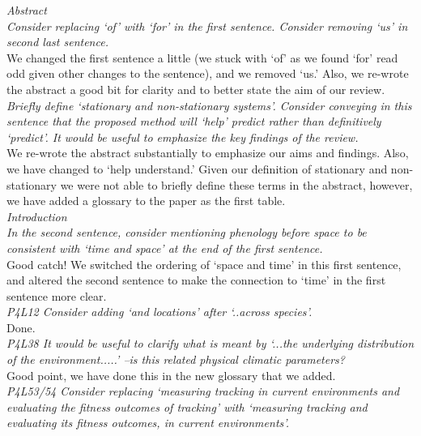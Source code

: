\documentclass[11pt]{article}
\begin{document}
\emph{ Abstract\\
Consider replacing `of' with `for' in the first sentence. Consider removing `us' in second
last sentence.}\\

We changed the first sentence a little (we stuck with `of' as we found `for' read odd given other changes to the sentence), and we removed `us.' Also, we re-wrote the abstract a good bit for clarity and to better state the aim of our review. \\

\emph{Briefly define `stationary and non-stationary systems'. Consider conveying in this sentence
that the proposed method will `help' predict rather than definitively `predict'. It would be
useful to emphasize the key findings of the review.}\\

We re-wrote the abstract substantially to emphasize our aims and findings. Also, we have changed to `help understand.' Given our definition of stationary and non-stationary we were not able to briefly define these terms in the abstract, however, we have added a glossary to the paper as the first table. \\

\emph{Introduction\\
In the second sentence, consider mentioning phenology before space to be consistent with
`time and space' at the end of the first sentence.}\\

Good catch! We switched the ordering of `space and time' in this first sentence, and altered the second sentence to make the connection to `time' in the first sentence more clear.\\

\emph{P4L12 Consider adding `and locations' after `..across species'.}\\

Done.\\

\emph{P4L38 It would be useful to clarify what is meant by `...the underlying distribution of the
environment.....' –is this related physical climatic parameters? }\\

Good point, we have done this in the new glossary that we added.\\

\emph{P4L53/54 Consider replacing `measuring tracking in current environments and evaluating the
fitness outcomes of tracking' with `measuring tracking and evaluating its fitness outcomes,
in current environments'. }\\
\end{document}
